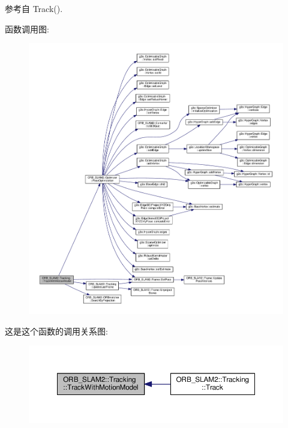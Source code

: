 参考自 Track().



函数调用图\-:
\nopagebreak
\begin{figure}[H]
\begin{center}
\leavevmode
\includegraphics[width=350pt]{classORB__SLAM2_1_1Tracking_aca19f1d69b30a6c6e49281d422ac8298_cgraph}
\end{center}
\end{figure}




这是这个函数的调用关系图\-:
\nopagebreak
\begin{figure}[H]
\begin{center}
\leavevmode
\includegraphics[width=350pt]{classORB__SLAM2_1_1Tracking_aca19f1d69b30a6c6e49281d422ac8298_icgraph}
\end{center}
\end{figure}


